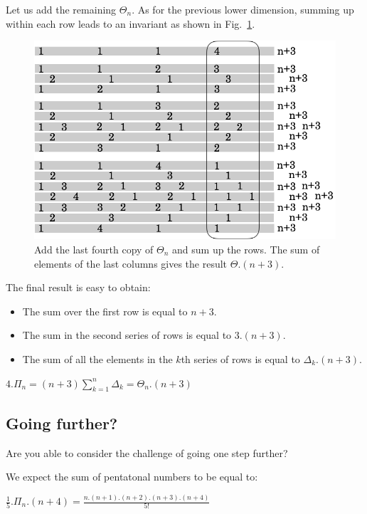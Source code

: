 Let us add the remaining $\Theta_n$.
As for the previous lower dimension, summing up within each row leads to an invariant as shown in Fig.~\ref{fig:Tetrahedral5}.
\begin{figure}[h]
\begin{center}
        \includegraphics[scale=0.36]{FiguresArithmetic/appTetrahedral5}
        \caption{Add the last fourth copy of $\Theta_n$ and sum up the rows. The sum of elements of the last columns gives the result $\Theta.(n+3)$.}
        \label{fig:Tetrahedral5}
\end{center}
\end{figure}
The final result is easy to obtain:
\begin{itemize}
\item 
The sum over the first row is equal to $n+3$.
\item
The sum in the second series of rows is equal to $3.(n+3)$. 
\item
The sum of all the elements in the $k$th series of rows is equal to
$\Delta_k.(n+3)$.
\end{itemize}
$4.\Pi_n = (n+3) \sum_{k=1}^{n} \Delta_k = \Theta_n.(n+3)$


\subsection{Going further?}

Are you able to consider the challenge of going one step further?

We expect the sum of pentatonal numbers to be equal to:

$\frac{1}{5}.\Pi_n.(n+4) = \frac{n.(n+1).(n+2).(n+3).(n+4)}{5!}$



